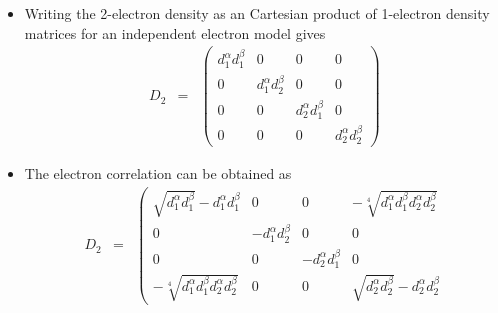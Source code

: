 \documentclass{amsart}
\begin{document}
\begin{itemize}
\begin{eqnarray}
\begin{matrix}
         c_{11}^2 & 0 & 0 & c_{11}c_{22} \\
         0 & 0 & 0 & 0 \\
         0 & 0 & 0 & 0 \\
         c_{22}c_{11} & 0 &0 & c_{22}^2
         \end{matrix}\right)
        \end{eqnarray}
        In terms of the 1-electron density matrix occupation numbers this can also be written as
        \begin{eqnarray}
        \label{Eq:D2-2el-2orb}
         D_{2} &=&
         \left(\begin{matrix}
         \sqrt{d_1^\alpha d_1^\beta} & 0 & 0 & -\sqrt[4]{d_1^\alpha d_1^\beta d_2^\alpha d_2^\beta} \\
         0 & 0 & 0 & 0 \\
         0 & 0 & 0 & 0 \\
         -\sqrt[4]{d_1^\alpha d_1^\beta d_2^\alpha d_2^\beta} & 0 &0 & \sqrt{d_2^\alpha d_2^\beta} 
         \end{matrix}\right)
        \end{eqnarray}
\item Writing the 2-electron density as an Cartesian product of 1-electron density matrices for an 
         independent electron model gives
         \begin{eqnarray}
         D_{2} &=&
         \left(\begin{matrix}
         d_1^\alpha d_1^\beta & 0 & 0 & 0\\
         0 & d_1^\alpha d_2^\beta & 0 & 0 \\
         0 & 0 & d_2^\alpha d_1^\beta & 0 \\
         0 & 0 &0 & d_2^\alpha d_2^\beta
         \end{matrix}\right)
        \end{eqnarray}
\item The electron correlation can be obtained as
         \begin{eqnarray}
         \label{Eq:Ecorrelation-2el-2orb}
         D_{2} &=&
         \left(\begin{matrix}
         \sqrt{d_1^\alpha d_1^\beta} - d_1^\alpha d_1^\beta & 0 & 0 & -\sqrt[4]{d_1^\alpha d_1^\beta d_2^\alpha d_2^\beta} \\
         0 & - d_1^\alpha d_2^\beta & 0 & 0 \\
         0 & 0 & - d_2^\alpha d_1^\beta & 0 \\
         -\sqrt[4]{d_1^\alpha d_1^\beta d_2^\alpha d_2^\beta} & 0 &0 & \sqrt{d_2^\alpha d_2^\beta} - d_2^\alpha d_2^\beta

\end{matrix}
\end{eqnarray}
\end{itemize}
\end{document}
